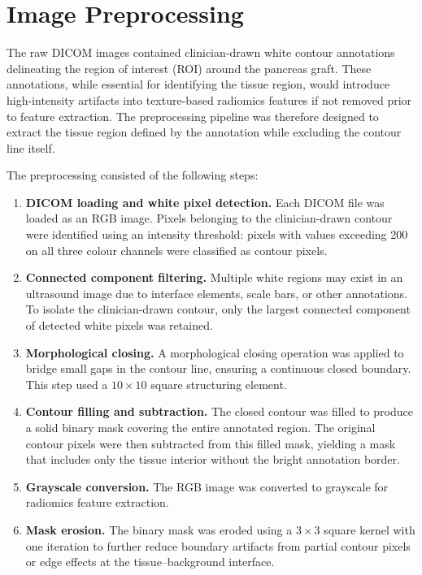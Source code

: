 \section{Image Preprocessing}
\label{sec:preprocessing}

The raw DICOM images contained clinician-drawn white contour annotations delineating the region of interest (ROI) around the pancreas graft. These annotations, while essential for identifying the tissue region, would introduce high-intensity artifacts into texture-based radiomics features if not removed prior to feature extraction. The preprocessing pipeline was therefore designed to extract the tissue region defined by the annotation while excluding the contour line itself.

The preprocessing consisted of the following steps:

\begin{enumerate}
\item \textbf{DICOM loading and white pixel detection.} Each DICOM file was loaded as an RGB image. Pixels belonging to the clinician-drawn contour were identified using an intensity threshold: pixels with values exceeding 200 on all three colour channels were classified as contour pixels.

\item \textbf{Connected component filtering.} Multiple white regions may exist in an ultrasound image due to interface elements, scale bars, or other annotations. To isolate the clinician-drawn contour, only the largest connected component of detected white pixels was retained.

\item \textbf{Morphological closing.} A morphological closing operation was applied to bridge small gaps in the contour line, ensuring a continuous closed boundary. This step used a $10 \times 10$ square structuring element.

\item \textbf{Contour filling and subtraction.} The closed contour was filled to produce a solid binary mask covering the entire annotated region. The original contour pixels were then subtracted from this filled mask, yielding a mask that includes only the tissue interior without the bright annotation border.

\item \textbf{Grayscale conversion.} The RGB image was converted to grayscale for radiomics feature extraction.

\item \textbf{Mask erosion.} The binary mask was eroded using a $3 \times 3$ square kernel with one iteration to further reduce boundary artifacts from partial contour pixels or edge effects at the tissue--background interface.
\end{enumerate}


